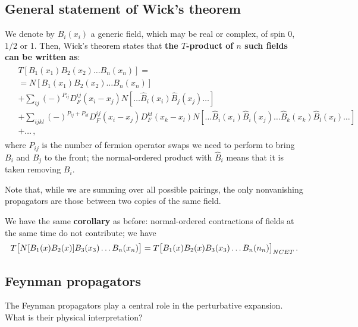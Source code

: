 \documentclass[main.tex]{subfiles}
\begin{document}
\subsection{General statement of Wick's theorem}

We denote by \(B_i (x_i)\) a generic field, which may be real or complex, of spin 0, \(1/2\) or 1. Then, Wick's theorem states that \textbf{the \(T\)-product of \(n\) such fields can be written as}: 
%
\begin{subequations}
\begin{align}
\begin{split}
& T[B_1 (x_1 ) B_2 (x_2 ) \dots B_n (x_n)]= \\
&= N[B_1 (x_1 ) B_2 (x_2 ) \dots B_n (x_n)]  \\
&+ \sum _{ij} (-)^{P_{ij}} D_F^{ij}(x_i - x_j) N[ \dots \hat{B}_{i}(x_i) \hat{B}_{j}(x_j)\dots]  \\
&+ \sum _{ijkl} (-)^{P_{ij}+P_{kl}} D_F^{ij}(x_i - x_j) D_F^{kl}(x_k - x_l)  N[\dots \hat{B}_{i}(x_i) \hat{B}_{i}(x_j)\dots \hat{B}_{k}(x_k) \hat{B}_{l}(x_l)\dots]  \\
&+ \dots \,,
\end{split}
\end{align}
\end{subequations}
%
where \(P_{ij}\) is the number of fermion operator swaps we need to perform to bring \(B_i\) and \(B_j\) to the front; the normal-ordered product with \(\hat{B}_i\) means that it is taken removing \(B_i\). 


Note that, while we are summing over all possible pairings, the only nonvanishing propagators are those between two copies of the same field. 

We have the same \textbf{corollary} as before: normal-ordered contractions of fields at the same time do not contribute; we have 
%
\begin{align}
T \qty[N[B_1 (x) B_2 (x)] B_3 (x_3 ) \dots B_n (x_n)] 
= T \qty[B_1 (x) B_2 (x) B_3 (x_3) \dots B_n (n_n)]_{NCET}
\,.
\end{align}

\subsection{Feynman propagators}

The Feynman propagators play a central role in the perturbative expansion. What is their physical interpretation?
\end{document}

